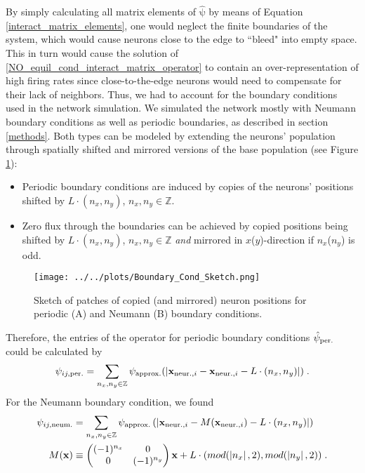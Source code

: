 \documentclass[10pt,a4paper]{article}
\begin{document}
By simply calculating all matrix elements of $\mathrm{\hat{\psi}}$ by means of Equation \eqref{interact_matrix_elements}, one would neglect the finite boundaries of the system, which would cause neurons close to the edge to ``bleed" into empty space. This in turn would cause the solution of \eqref{NO_equil_cond_interact_matrix_operator} to contain an over-representation of high firing rates since close-to-the-edge neurons would need to compensate for their lack of neighbors. Thus, we had to account for the boundary conditions used in the network simulation. We simulated the network mostly with Neumann boundary conditions as well as periodic boundaries, as described in section \ref{methods}. Both types can be modeled by extending the neurons' population through spatially shifted and mirrored versions of the base population (see Figure \ref{Bound_Cond_Patches}):
\begin{itemize}
\item Periodic boundary conditions are induced by copies of the neurons' positions shifted by $L\cdot (n_x,n_y)$, $n_x,n_y \in \mathbb{Z}$.
\item Zero flux through the boundaries can be achieved by copied positions being shifted by $L\cdot (n_x,n_y)$, $n_x,n_y \in \mathbb{Z}$ \textit{and} mirrored in $x$($y$)-direction if $n_x$($n_y$) is odd.
\end{itemize}
\begin{figure}
\begin{center}
\texttt{[image: ../../plots/Boundary\_Cond\_Sketch.png]}
\end{center}
\caption[Sketch of patches of copied (and mirrored) neuron positions]{Sketch of patches of copied (and mirrored) neuron positions for periodic (A) and Neumann (B) boundary conditions.}
\label{Bound_Cond_Patches}
\end{figure}
Therefore, the entries of the operator for periodic boundary conditions $\hat{\psi}_{\rm per.}$ could be calculated by
\begin{equation}
\psi_{ij,\rm per.} = \sum_{n_x,n_y \in \mathbb{Z}} \psi_{\rm approx.} (|\mathbf{x}_{\mathrm{ neur.},i}-\mathbf{x}_{\mathrm{ neur.},i} - L \cdot (n_x,n_y)|) \; .
\label{Psi_entries_periodic_bound}
\end{equation}
For the Neumann boundary condition, we found
\begin{align}
\psi_{ij,\rm neum.} &= \sum_{n_x,n_y \in \mathbb{Z}} \psi_{\rm approx.} \left(|\mathbf{x}_{\mathrm{ neur.},i}-M(\mathbf{x}_{\mathrm{neur.},i}) - L \cdot (n_x,n_y)| \right) \label{Psi_entries_neumann_bound} \\
M(\mathbf{x}) &\equiv  
 \begin{pmatrix}
  (-1)^{n_x} & 0\\
  0 & (-1)^{n_y}
 \end{pmatrix}
\mathbf{x} + L \cdot (mod(\left| n_x\right|,2),mod(\left| n_y\right|,2)) \; . \label{Mirror_Operator}
\end{align}
\end{document}
